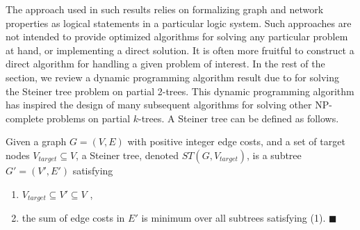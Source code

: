 The approach used in such results relies on formalizing graph and network properties as logical statements in a particular logic system. 
Such approaches are not intended to provide optimized algorithms for solving any particular problem at hand, or implementing a direct solution. It is often more fruitful to construct a direct algorithm for handling a given problem of interest.
In the rest of the section, we review a dynamic programming algorithm result due to \cite{wald1983steiner} for solving the Steiner tree problem on partial 2-trees.
This dynamic programming algorithm has inspired the design of many subsequent algorithms for solving other NP-complete problems on partial $k$-trees. 
A Steiner tree can be defined as follows.
\begin{definition}
\normalfont
Given a graph $G = (V,E)$ with positive integer edge costs, and a set of target nodes $V_{target}\subseteq V$, a Steiner tree, denoted $ST(G,V_{target} )$, is a subtree $G' = (V',E')$ satisfying
\begin{enumerate}[noitemsep]
\item  $V_{target} \subseteq V'\subseteq V$ ,
\item the sum of edge costs in $E'$ is minimum over all subtrees satisfying (1). $\blacksquare$
\end{enumerate}
\end{definition}

